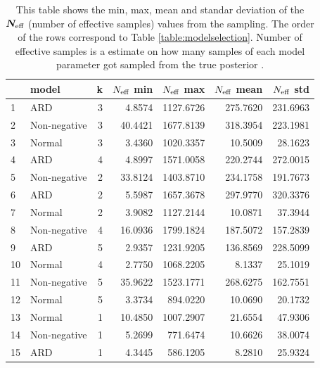 \documentclass[12pt]{article}
\begin{document}
    \begin{table}[H]
        \centering
        \caption{This table shows the min, max, mean and standar deviation of the $\boldsymbol{N_{\text{eff}}}$ (number of effective samples) values from the sampling. The order of the rows correspond to Table \ref{table:modelselection}. Number of effective samples is a estimate on how many samples of each model parameter got sampled from the true posterior \cite{Neff}.}
        \label{table:neffs}
        \begin{tabular}{llr|rr|rr}
            \toprule
            {} &         model &  k &  $N_{\text{eff}}$ min &  $N_{\text{eff}}$ max &  $N_{\text{eff}}$ mean &  $N_{\text{eff}}$ std \\
            \midrule
            1  &           ARD &  3 &    4.8574 & 1127.6726 &   275.7620 &  231.6963 \\
            2  &  Non-negative &  3 &   40.4421 & 1677.8139 &   318.3954 &  223.1981 \\
            3  &        Normal &  3 &    3.4360 & 1020.3357 &    10.5009 &   28.1623 \\
            4  &           ARD &  4 &    4.8997 & 1571.0058 &   220.2744 &  272.0015 \\
            5  &  Non-negative &  2 &   33.8124 & 1403.8710 &   234.1758 &  191.7673 \\
            6  &           ARD &  2 &    5.5987 & 1657.3678 &   297.9770 &  320.3376 \\
            7  &        Normal &  2 &    3.9082 & 1127.2144 &    10.0871 &   37.3944 \\
            8  &  Non-negative &  4 &   16.0936 & 1799.1824 &   187.5072 &  157.2839 \\
            9  &           ARD &  5 &    2.9357 & 1231.9205 &   136.8569 &  228.5099 \\
            10 &        Normal &  4 &    2.7750 & 1068.2205 &     8.1337 &   25.1019 \\
            11 &  Non-negative &  5 &   35.9622 & 1523.1771 &   268.6275 &  162.7551 \\
            12 &        Normal &  5 &    3.3734 &  894.0220 &    10.0690 &   20.1732 \\
            13 &        Normal &  1 &   10.4850 & 1007.2907 &    21.6554 &   47.9306 \\
            14 &  Non-negative &  1 &    5.2699 &  771.6474 &    10.6626 &   38.0074 \\
            15 &           ARD &  1 &    4.3445 &  586.1205 &     8.2810 &   25.9324 \\
            \bottomrule
        \end{tabular}
    \end{table}
\end{document}

